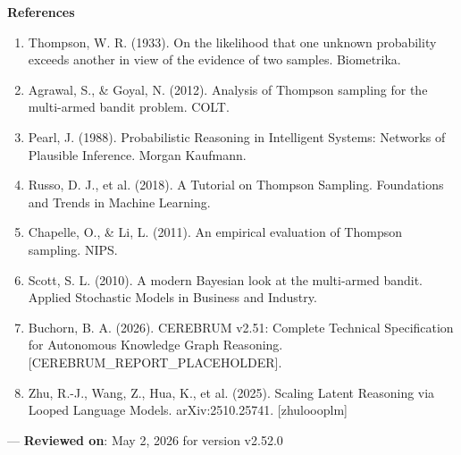 \textbf{References}
\begin{enumerate}
\item Thompson, W. R. (1933). On the likelihood that one unknown probability exceeds another in view of the evidence of two samples. Biometrika.
\item Agrawal, S., \& Goyal, N. (2012). Analysis of Thompson sampling for the multi-armed bandit problem. COLT.
\item Pearl, J. (1988). Probab\-ilistic Reasoning in Intelligent Systems: Networks of Plausible Inference. Morgan Kaufmann.
\item Russo, D. J., et al. (2018). A Tutorial on Thompson Sampling. Foundations and Trends in Machine Learning.
\item Chapelle, O., \& Li, L. (2011). An empirical evaluation of Thompson sampling. NIPS.
\item Scott, S. L. (2010). A modern Bayesian look at the multi-armed bandit. Applied Stochastic Models in Business and Industry.
\item Buchorn, B. A. (2026). CEREBRUM v2.51: Complete Technical Specif\-ication for Autonomous Knowledge Graph Reasoning. [CEREBRUM\_REPORT\_PLACEHOLDER].
\item Zhu, R.-J., Wang, Z., Hua, K., et al. (2025). Scaling Latent Reasoning via Looped Language Models. arXiv:2510.25741. [zhu\-loooplm]

\end{enumerate}
---
\textbf{Reviewed on}: May 2, 2026 for version v2.52.0
